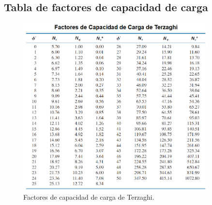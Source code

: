 \documentclass{article} %
\begin{document}
\newpage
\subsection*{Tabla de factores de capacidad de carga}
\begin{figure}[h]
    \centering
    \includegraphics[width=0.9\textwidth]{Graficos/Terzaghi.PNG}
    \caption{Factores de capacidad de carga de Terzaghi.}
    \label{fig:factores_terzaghi}
\end{figure}
\end{document}
